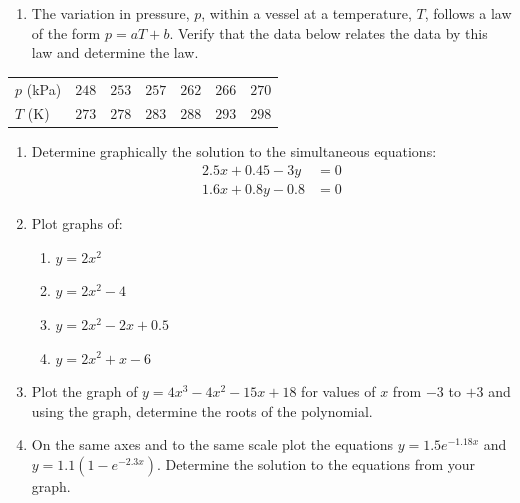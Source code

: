 \documentclass[
  12pt,
  oneside]{book}
\providecommand{\tightlist}{%
  \setlength{\itemsep}{0pt}\setlength{\parskip}{0pt}}
\theoremstyle{definition}
\theoremstyle{definition}
\theoremstyle{definition}
\theoremstyle{definition}
\theoremstyle{remark}
\begin{document}
\begin{enumerate}
\def\labelenumi{\arabic{enumi}.}
\setcounter{enumi}{2}
\tightlist
\item
  The variation in pressure, \(p\), within a vessel at a temperature, \(T\), follows a law of the form \(p = aT + b\). Verify that the data below relates the data by this law and determine the law.
\end{enumerate}

\begin{longtable}[]{@{}
  >{\raggedright\arraybackslash}p{}
  >{\raggedright\arraybackslash}p{}
  >{\raggedright\arraybackslash}p{}
  >{\raggedright\arraybackslash}p{}
  >{\raggedright\arraybackslash}p{}
  >{\raggedright\arraybackslash}p{}
  >{\raggedright\arraybackslash}p{}@{}}
\toprule
\endhead
\(p\) (kPa) & \(248\) & \(253\) & \(257\) & \(262\) & \(266\) & \(270\) \\
\(T\) (K) & \(273\) & \(278\) & \(283\) & \(288\) & \(293\) & \(298\) \\
\bottomrule
\end{longtable}

\begin{enumerate}
\def\labelenumi{\arabic{enumi}.}
\setcounter{enumi}{3}
\item
  Determine graphically the solution to the simultaneous equations:
  \begin{align*}
  2.5x + 0.45 - 3y &= 0\\
  1.6x + 0.8y - 0.8 &= 0
  \end{align*}
\item
  Plot graphs of:

  \begin{enumerate}
  \def\labelenumii{\roman{enumii})}
  \tightlist
  \item
    \(y = 2x^2\)
  \item
    \(y = 2x^2 - 4\)
  \item
    \(y = 2x^2 - 2x + 0.5\)
  \item
    \(y = 2x^2 + x - 6\)
  \end{enumerate}
\item
  Plot the graph of \(y = 4x^3 - 4x^2 - 15x + 18\) for values of \(x\) from \(-3\) to \(+3\) and using the graph, determine the roots of the polynomial.
\item
  On the same axes and to the same scale plot the equations \(y = 1.5e^{-1.18x}\) and \(y = 1.1(1 - e^{-2.3x})\). Determine the solution to the equations from your graph.
\end{enumerate}
\end{document}
